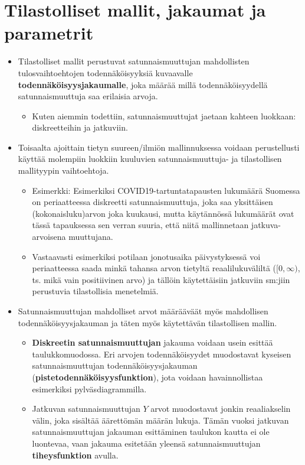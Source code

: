 \documentclass[
]{book}
\providecommand{\tightlist}{%
  \setlength{\itemsep}{0pt}\setlength{\parskip}{0pt}}
\begin{document}
\hypertarget{alaluku43}{%
\section{Tilastolliset mallit, jakaumat ja parametrit}\label{alaluku43}}

\begin{itemize}
\tightlist
\item
  Tilastolliset mallit perustuvat satunnaismuuttujan mahdollisten tulosvaihtoehtojen todennäköisyyksiä kuvaavalle \textbf{todennäköisyysjakaumalle}, joka määrää millä todennäköisyydellä satunnaismuuttuja saa erilaisia arvoja.

  \begin{itemize}
  \tightlist
  \item
    Kuten aiemmin todettiin, satunnaismuuttujat jaetaan kahteen luokkaan: diskreetteihin ja jatkuviin.
  \end{itemize}
\item
  Toisaalta ajoittain tietyn suureen/ilmiön mallinnuksessa voidaan perustellusti käyttää molempiin luokkiin kuuluvien satunnaismuuttuja- ja tilastollisen mallityypin vaihtoehtoja.

  \begin{itemize}
  \tightlist
  \item
    Esimerkki: Esimerkiksi COVID19-tartuntatapausten lukumäärä Suomessa on periaatteessa diskreetti satunnaismuuttuja, joka saa yksittäisen (kokonaisluku)arvon joka kuukausi, mutta käytännössä lukumäärät ovat tässä tapauksessa sen verran suuria, että niitä mallinnetaan jatkuva-arvoisena muuttujana.
  \item
    Vastaavasti esimerkiksi potilaan jonotusaika päivystyksessä voi periaatteessa saada minkä tahansa arvon tietyltä reaalilukuväliltä (\([0,\infty)\), ts. mikä vain positiivinen arvo) ja tällöin käytettäisiin jatkuviin sm:jiin perustuvia tilastollisia menetelmiä.
  \end{itemize}
\item
  Satunnaismuuttujan mahdolliset arvot määrääväät myös mahdollisen todennäköisyysjakauman ja täten myös käytettävän tilastollisen mallin.

  \begin{itemize}
  \tightlist
  \item
    \textbf{Diskreetin satunnaismuuttujan} jakauma voidaan usein esittää taulukkomuodossa. Eri arvojen todennäköisyydet muodostavat kyseisen satunnaismuuttujan todennäköisyysjakauman (\textbf{pistetodennäköisyysfunktion}), jota voidaan havainnollistaa esimerkiksi pylväsdiagrammilla.
  \item
    Jatkuvan satunnaismuuttujan \(Y\) arvot muodostavat jonkin reaaliakselin välin, joka sisältää äärettömän määrän lukuja. Tämän vuoksi jatkuvan satunnaismuuttujan jakauman esittäminen taulukon kautta ei ole luontevaa, vaan jakauma esitetään yleensä satunnaismuuttujan \textbf{tiheysfunktion} avulla.


\end{itemize}
\end{itemize}
\end{document}
